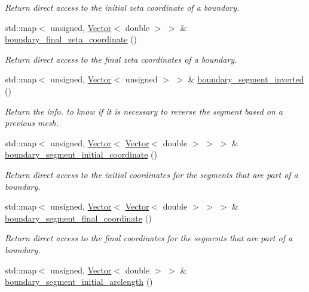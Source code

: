 \begin{DoxyCompactItemize}
\begin{DoxyCompactList}\small\item\em Return direct access to the initial zeta coordinate of a boundary. \end{DoxyCompactList}\item 
std\+::map$<$ unsigned, \hyperlink{classoomph_1_1Vector}{Vector}$<$ double $>$ $>$ \& \hyperlink{classoomph_1_1UnstructuredTwoDMeshGeometryBase_adfb63b763c3b6ffe323d442db59282e1}{boundary\+\_\+final\+\_\+zeta\+\_\+coordinate} ()
\begin{DoxyCompactList}\small\item\em Return direct access to the final zeta coordinates of a boundary. \end{DoxyCompactList}\item 
std\+::map$<$ unsigned, \hyperlink{classoomph_1_1Vector}{Vector}$<$ unsigned $>$ $>$ \& \hyperlink{classoomph_1_1UnstructuredTwoDMeshGeometryBase_a3fec5401134aabfc558e6e5cbd4c64a3}{boundary\+\_\+segment\+\_\+inverted} ()
\begin{DoxyCompactList}\small\item\em Return the info. to know if it is necessary to reverse the segment based on a previous mesh. \end{DoxyCompactList}\item 
std\+::map$<$ unsigned, \hyperlink{classoomph_1_1Vector}{Vector}$<$ \hyperlink{classoomph_1_1Vector}{Vector}$<$ double $>$ $>$ $>$ \& \hyperlink{classoomph_1_1UnstructuredTwoDMeshGeometryBase_a80f8674a188d2b915ef5a81ea47c3c2c}{boundary\+\_\+segment\+\_\+initial\+\_\+coordinate} ()
\begin{DoxyCompactList}\small\item\em Return direct access to the initial coordinates for the segments that are part of a boundary. \end{DoxyCompactList}\item 
std\+::map$<$ unsigned, \hyperlink{classoomph_1_1Vector}{Vector}$<$ \hyperlink{classoomph_1_1Vector}{Vector}$<$ double $>$ $>$ $>$ \& \hyperlink{classoomph_1_1UnstructuredTwoDMeshGeometryBase_af6babfe55a6332df94e6edd6fdeab0c1}{boundary\+\_\+segment\+\_\+final\+\_\+coordinate} ()
\begin{DoxyCompactList}\small\item\em Return direct access to the final coordinates for the segments that are part of a boundary. \end{DoxyCompactList}\item 
std\+::map$<$ unsigned, \hyperlink{classoomph_1_1Vector}{Vector}$<$ double $>$ $>$ \& \hyperlink{classoomph_1_1UnstructuredTwoDMeshGeometryBase_a8c7a3d2e637451a4dd01182ee6e8481d}{boundary\+\_\+segment\+\_\+initial\+\_\+arclength} ()

\end{DoxyCompactItemize}
